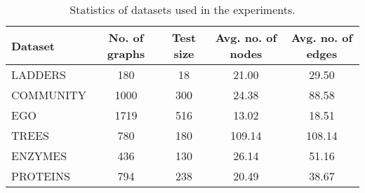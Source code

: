 \begin{table}[h!]
    \footnotesize
    \centering
    \caption{Statistics of datasets used in the experiments.}
    \label{tab:generation-datasets}
    \renewcommand{\arraystretch}{1.2}
    \begin{tabular}{lcccc}
        \toprule
         \textbf{Dataset} & \textbf{No. of graphs} & \textbf{Test size} & \textbf{Avg. no. of nodes} & \textbf{Avg. no. of edges}\\
         \midrule
         LADDERS & 180 & 18 & 21.00 & 29.50 \\
         COMMUNITY & 1000 & 300 & 24.38 & 88.58 \\
         EGO & 1719 & 516 & 13.02 & 18.51 \\
         TREES & 780 & 180 & 109.14 & 108.14 \\
         ENZYMES & 436 & 130 & 26.14 & 51.16 \\
         PROTEINS & 794 & 238 & 20.49 & 38.67 \\
        \bottomrule
    \end{tabular}
\end{table}